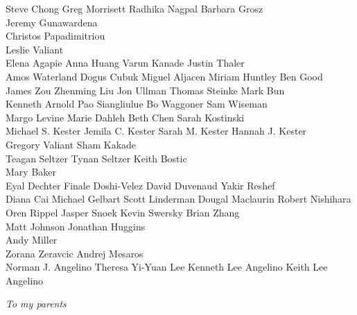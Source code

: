 \begin{spacing}{2}
\begin{center}
Steve Chong \quad Greg Morrisett \quad Radhika Nagpal \quad Barbara Grosz \\
Jeremy Gunawardena \\
Christos Papadimitriou \\
Leslie Valiant \\
Elena Agapie \quad Anna Huang \quad Varun Kanade \quad Justin Thaler \\
Amos Waterland \quad Dogus Cubuk \quad Miguel Aljacen \quad Miriam Huntley \quad Ben Good \\
James Zou \quad Zhenming Liu \quad Jon Ullman \quad Thomas Steinke \quad Mark Bun \\ 
Kenneth Arnold \quad Pao Siangliulue \quad Bo Waggoner \quad Sam Wiseman \\
Margo Levine \quad Marie Dahleh \quad Beth Chen \quad Sarah Kostinski \\
Michael S. Kester \quad Jemila C. Kester \quad Sarah M. Kester \quad Hannah J. Kester \\
Gregory Valiant \quad Sham Kakade \\
Teagan Seltzer \quad Tynan Seltzer \quad Keith Bostic \\
Mary Baker \\
Eyal Dechter \quad Finale Doshi-Velez \quad David Duvenaud \quad Yakir Reshef \\
Diana Cai \quad Michael Gelbart \quad Scott Linderman \quad Dougal Maclaurin \quad Robert Nishihara \\
Oren Rippel \quad Jasper Snoek \quad Kevin Swersky \quad Brian Zhang \\ 
Matt Johnson \quad Jonathan Huggins \\ 
Andy Miller  \\
Zorana Zeravcic \quad Andrej Mesaros \\
Norman J. Angelino \quad Theresa Yi-Yuan Lee \quad Kenneth Lee Angelino \quad Keith Lee Angelino
\end{center}
\end{spacing}


\newpage
\begin{center}
\end{center}
\begin{center}
\end{center}
\hfill \emph{To my parents}
